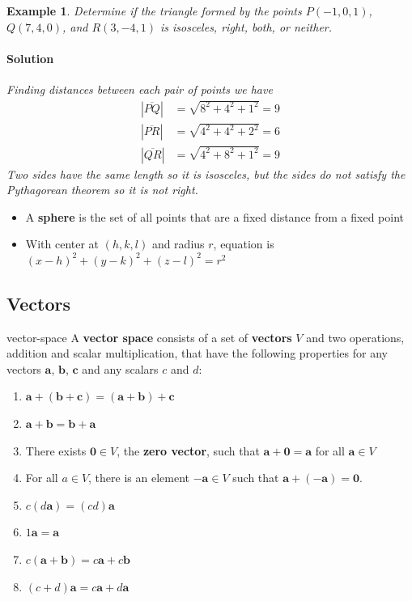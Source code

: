 \documentclass[letterpaper, 11pt, openany]{book}
\theoremstyle{mytheoremstyle}
\theoremstyle{myexamplestyle}
\newtheorem{example}{Example}[section]
\newenvironment{solution}{\paragraph{\sffamily \smaller \fontseries{b}\selectfont Solution}}{\hfill\faSquare}
\begin{document}
\begin{example}\label{e:3dcoord-triangle}
    Determine if the triangle formed by the points $P(-1, 0 ,1)$, $Q(7, 4, 0)$, and $R(3, -4, 1)$ is isosceles, right, both, or neither.
    \begin{solution}
        Finding distances between each pair of points we have
        \begin{align*}
            |\overline{PQ}| &= \sqrt{8^{2} + 4^{2} + 1^{2}} = 9\\
            |\overline{PR}| &= \sqrt{4^{2} + 4^{2} + 2^{2}} = 6\\
            |\overline{QR}| &= \sqrt{4^{2} + 8^{2} + 1^{2}} = 9
        \end{align*}
        Two sides have the same length so it is isosceles, but the sides do not satisfy the Pythagorean theorem so it is not right.
    \end{solution}
\end{example}

\begin{itemize}
    \item A \textbf{sphere} is the set of all points that are a fixed distance from a fixed point
    \item With center at $(h,k,l)$ and radius $r$, equation is $(x-h)^{2} + (y-k)^{2} + (z-l)^{2} = r^{2}$
\end{itemize}

\subsection{Vectors}

\begin{definition}{}{vector-space}
    A \textbf{vector space} consists of a set of \textbf{vectors} $V$ and two operations, addition and scalar multiplication, that have the following properties for any vectors $\mathbf{a}$, $\mathbf{b}$, $\mathbf{c}$ and any scalars $c$ and $d$:
    \begin{enumerate}
        \item $\mathbf{a} + (\mathbf{b} + \mathbf{c}) = (\mathbf{a} + \mathbf{b}) + \mathbf{c}$
        \item $\mathbf{a} + \mathbf{b} = \mathbf{b} + \mathbf{a}$
        \item There exists $\mathbf{0} \in V$, the \textbf{zero vector}, such that $\mathbf{a} + \mathbf{0} = \mathbf{a}$ for all $\mathbf{a} \in V$
        \item For all $a \in V$, there is an element $-\mathbf{a} \in V$ such that $\mathbf{a} + (-\mathbf{a}) = \mathbf{0}$.
        \item $c(d\mathbf{a}) = (cd)\mathbf{a}$
        \item $1\mathbf{a} = \mathbf{a}$
        \item $c(\mathbf{a} + \mathbf{b}) = c\mathbf{a} + c\mathbf{b}$
        \item $(c+d)\mathbf{a} = c\mathbf{a} + d\mathbf{a}$
    \end{enumerate}
\end{definition}
\end{document}
